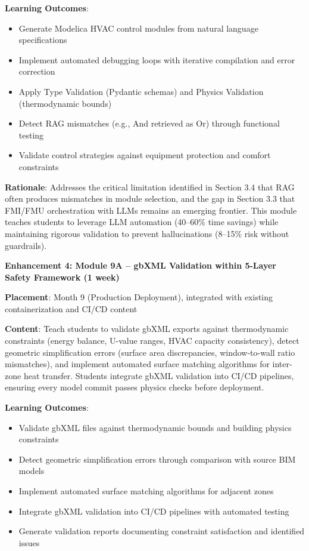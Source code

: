 \documentclass[12pt,a4paper]{article}
\begin{document}
\textbf{Learning Outcomes}:
\begin{itemize}
  \item Generate Modelica HVAC control modules from natural language specifications
  \item Implement automated debugging loops with iterative compilation and error correction
  \item Apply Type Validation (Pydantic schemas) and Physics Validation (thermodynamic bounds)
  \item Detect RAG mismatches (e.g., And retrieved as Or) through functional testing
  \item Validate control strategies against equipment protection and comfort constraints
\end{itemize}

\textbf{Rationale}: Addresses the critical limitation identified in Section 3.4 that RAG often produces mismatches in module selection, and the gap in Section 3.3 that FMI/FMU orchestration with LLMs remains an emerging frontier. This module teaches students to leverage LLM automation (40--60\% time savings) while maintaining rigorous validation to prevent hallucinations (8--15\% risk without guardrails).

\textbf{Enhancement 4: Module 9A -- gbXML Validation within 5-Layer Safety Framework (1 week)}

\textbf{Placement}: Month 9 (Production Deployment), integrated with existing containerization and CI/CD content

\textbf{Content}: Teach students to validate gbXML exports against thermodynamic constraints (energy balance, U-value ranges, HVAC capacity consistency), detect geometric simplification errors (surface area discrepancies, window-to-wall ratio mismatches), and implement automated surface matching algorithms for inter-zone heat transfer. Students integrate gbXML validation into CI/CD pipelines, ensuring every model commit passes physics checks before deployment.

\textbf{Learning Outcomes}:
\begin{itemize}
  \item Validate gbXML files against thermodynamic bounds and building physics constraints
  \item Detect geometric simplification errors through comparison with source BIM models
  \item Implement automated surface matching algorithms for adjacent zones
  \item Integrate gbXML validation into CI/CD pipelines with automated testing
  \item Generate validation reports documenting constraint satisfaction and identified issues
\end{itemize}
\end{document}
